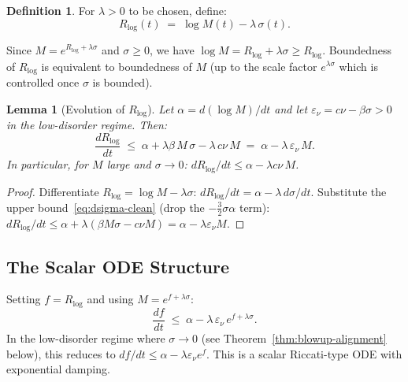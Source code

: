 \documentclass[11pt]{article}
\newtheorem{lemma}[theorem]{Lemma}
\theoremstyle{definition}
\newtheorem{definition}[theorem]{Definition}
\theoremstyle{remark}
\begin{document}
\begin{definition}\label{def:R-log}
  For $\lambda>0$ to be chosen, define:
  \begin{equation}\label{eq:R-log-def}
    R_{\log}(t) \;=\; \log M(t) - \lambda\,\sigma(t).
  \end{equation}
\end{definition}

Since $M=e^{R_{\log}+\lambda\sigma}$ and $\sigma\geq 0$, we have $\log M = R_{\log}+\lambda\sigma
\geq R_{\log}$.  Boundedness of $R_{\log}$ is equivalent to boundedness of $M$ (up to
the scale factor $e^{\lambda\sigma}$ which is controlled once $\sigma$ is bounded).

\begin{lemma}[Evolution of $R_{\log}$]\label{lem:R-log-evol}
  Let $\alpha = d(\log M)/dt$ and let $\varepsilon_\nu = c\nu - \beta\sigma > 0$ in the
  low-disorder regime.  Then:
  \begin{equation}\label{eq:R-log-evol}
    \frac{d R_{\log}}{dt} \;\leq\; \alpha + \lambda\beta\,M\,\sigma - \lambda\,c\nu\,M
    \;=\; \alpha - \lambda\,\varepsilon_\nu\,M.
  \end{equation}
  In particular, for $M$ large and $\sigma\to 0$: $dR_{\log}/dt\leq\alpha - \lambda c\nu\,M$.
\end{lemma}
\begin{proof}
  Differentiate $R_{\log} = \log M - \lambda\sigma$:
  $dR_{\log}/dt = \alpha - \lambda\,d\sigma/dt$.
  Substitute the upper bound~\eqref{eq:dsigma-clean} (drop the $-\frac{3}{2}\sigma\alpha$
  term):
  $dR_{\log}/dt\leq\alpha + \lambda(\beta M\sigma - c\nu M) = \alpha - \lambda\varepsilon_\nu M$.
\end{proof}

\subsection{The Scalar ODE Structure}

Setting $f = R_{\log}$ and using $M = e^{f+\lambda\sigma}$:
\begin{equation}\label{eq:scalar-ode}
  \frac{df}{dt} \;\leq\; \alpha - \lambda\,\varepsilon_\nu\,e^{f+\lambda\sigma}.
\end{equation}
In the low-disorder regime where $\sigma\to 0$ (see Theorem~\ref{thm:blowup-alignment}
below), this reduces to $df/dt\leq\alpha - \lambda\varepsilon_\nu e^f$.
This is a scalar Riccati-type ODE with exponential damping.
\end{document}
